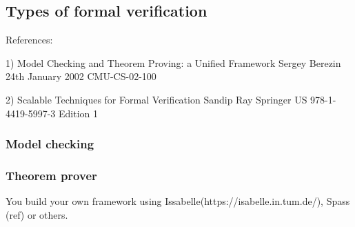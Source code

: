 \subsection{Types of formal verification}

References:

1) Model Checking and Theorem Proving:
a Unified Framework
Sergey Berezin
24th January 2002
CMU-CS-02-100


2) Scalable Techniques for Formal Verification
Sandip Ray
Springer US
978-1-4419-5997-3
Edition 1


\subsubsection{Model checking}


\subsubsection{Theorem prover}

You build your own framework using Issabelle(https://isabelle.in.tum.de/), Spass (ref) or others.


